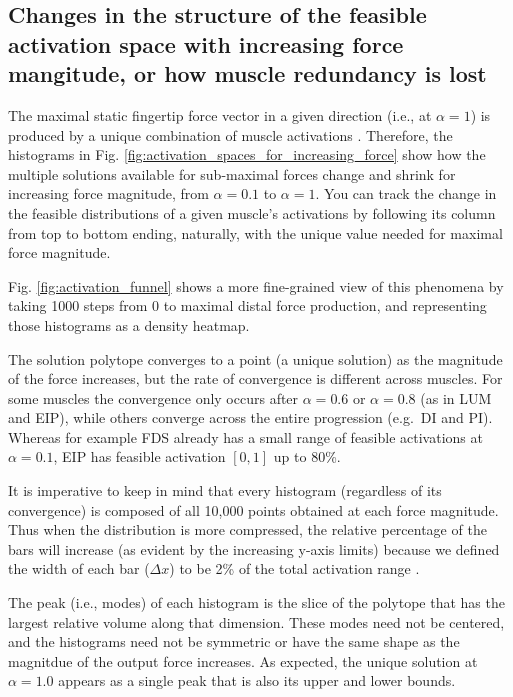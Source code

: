 \documentclass[10pt,letterpaper]{article}
\begin{document}
\subsection*{Changes in the structure of the feasible activation space with increasing force mangitude, or how muscle redundancy is lost} %
\label{sub:activation_spaces_for_increasing_force}
The maximal static fingertip force vector in a given  direction (i.e., at $\alpha=1$) is produced by  a unique combination of muscle activations \cite{spoor1983balancing,Chao1978Graphical,valero-cuevas2015fundamentals}. Therefore, the histograms in Fig. \ref{fig:activation_spaces_for_increasing_force} show how the multiple solutions available for sub-maximal forces change and shrink  for increasing force magnitude, from $\alpha=0.1$  to $\alpha=1$. You can track the change in the feasible distributions of a given muscle's activations by following its column from top to bottom ending, naturally, with the unique value needed for maximal force magnitude.

Fig. \ref{fig:activation_funnel} shows a more fine-grained view of this phenomena by taking 1000 steps from 0 to maximal distal force production, and representing those histograms as a density heatmap.



The solution polytope converges to a point (a unique solution) as the magnitude of the force increases, but the rate of convergence is different across muscles.
For some muscles the convergence only occurs after $\alpha=0.6$ or $\alpha=0.8$ (as in LUM and EIP), while others converge across the entire progression (e.g.\ DI and PI).
Whereas for example FDS already has a small range of feasible activations at $\alpha=0.1$, EIP has feasible activation $[0,1]$ up to 80\%.

It is imperative to keep in mind that every histogram (regardless of its convergence) is composed of  all 10,000 points obtained at each force magnitude. Thus when the distribution is more compressed, the relative percentage of the bars will increase (as evident by the increasing y-axis limits) because we defined the width of each bar ($\Delta x$) to be 2\% of the total activation range \cite{ball1997elementary}.

The peak (i.e., modes) of each histogram is the slice of the polytope that has the largest relative volume along that dimension. These modes need not be centered, and the histograms need not be symmetric or have the same shape as the magnitdue of the output force increases.
As expected, the unique solution at $\alpha=1.0$ appears as a single peak that is also its upper and lower bounds.
\end{document}
